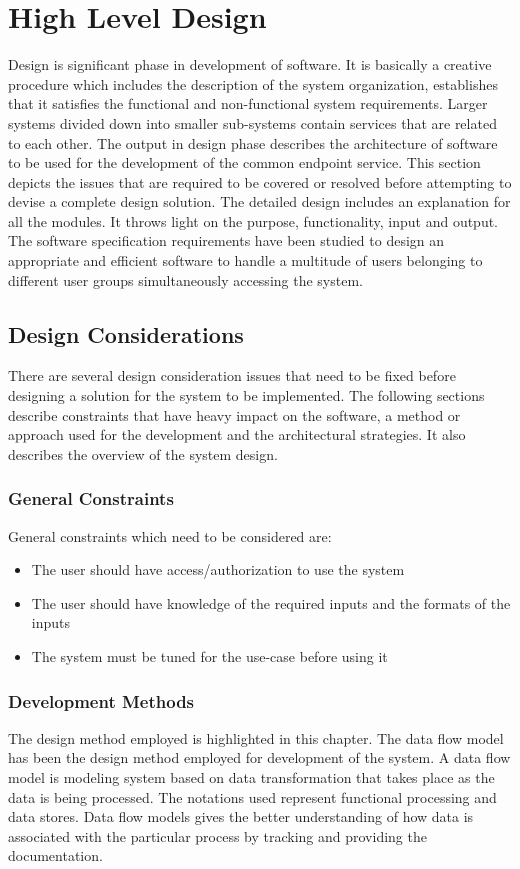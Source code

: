 \chapter{High Level Design}
Design is significant phase in development of software. It is basically a creative procedure which includes the description of the system organization, establishes that it satisfies the functional and non-functional system requirements. Larger systems divided down into smaller sub-systems contain services that are related to each other. The output in design phase describes the architecture of software to be used for the development of the common endpoint service. This section depicts the issues that are required to be covered or resolved before attempting to devise a complete design solution. The detailed design includes an explanation for all the modules. It throws light on the purpose, functionality, input and output. The software specification requirements have been studied to design an appropriate and efficient software to handle a multitude of users belonging to different user groups simultaneously accessing the system.

\section{Design Considerations}
There are several design consideration issues that need to be fixed before designing a solution for the system to be implemented. The following sections describe constraints that have heavy impact on the software, a method or approach used for the development and the architectural strategies. It also describes the overview of the system design.

    \subsection{General Constraints}
    General constraints which need to be considered are:

    \begin{itemize}
    \item The user should have access/authorization to use the system
    \item The user should have knowledge of the required inputs and the formats of the inputs
    \item The system must be tuned for the use-case before using it

    \end{itemize}

    \subsection{Development Methods}
    The design method employed is highlighted in this chapter. The data flow model has been the design method employed for development of the system. A data flow model is modeling system based on data transformation that takes place as the data is being processed. The notations used represent functional processing and data stores. Data flow models gives the better understanding of how data is associated with the particular process by tracking and providing the documentation.

